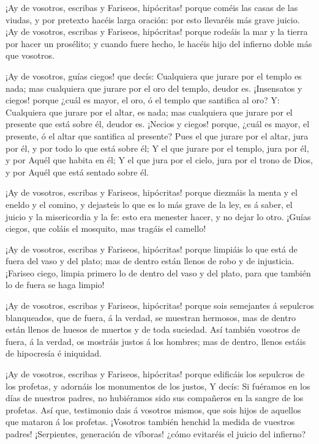  ¡Ay de vosotros, escribas y Fariseos, hipócritas! porque
coméis las casas de las viudas, y por pretexto hacéis larga oración: por
esto llevaréis más grave juicio.  ¡Ay de vosotros,
escribas y Fariseos, hipócritas! porque rodeáis la mar y la tierra por
hacer un prosélito; y cuando fuere hecho, le hacéis hijo del infierno
doble más que vosotros.

 ¡Ay de vosotros, guías ciegos! que decís: Cualquiera que
jurare por el templo es nada; mas cualquiera que jurare por el oro del
templo, deudor es.  ¡Insensatos y ciegos! porque ¿cuál es
mayor, el oro, ó el templo que santifica al oro?  Y:
Cualquiera que jurare por el altar, es nada; mas cualquiera que jurare
por el presente que está sobre él, deudor es.  ¡Necios y
ciegos! porque, ¿cuál es mayor, el presente, ó el altar que santifica al
presente?  Pues el que jurare por el altar, jura por él,
y por todo lo que está sobre él;  Y el que jurare por el
templo, jura por él, y por Aquél que habita en él;  Y el
que jura por el cielo, jura por el trono de Dios, y por Aquél que está
sentado sobre él.

 ¡Ay de vosotros, escribas y Fariseos, hipócritas! porque
diezmáis la menta y el eneldo y el comino, y dejasteis lo que es lo más
grave de la ley, es á saber, el juicio y la misericordia y la fe: esto
era menester hacer, y no dejar lo otro.  ¡Guías ciegos,
que coláis el mosquito, mas tragáis el camello!

 ¡Ay de vosotros, escribas y Fariseos, hipócritas! porque
limpiáis lo que está de fuera del vaso y del plato; mas de dentro están
llenos de robo y de injusticia.  ¡Fariseo ciego, limpia
primero lo de dentro del vaso y del plato, para que también lo de fuera
se haga limpio!

 ¡Ay de vosotros, escribas y Fariseos, hipócritas! porque
sois semejantes á sepulcros blanqueados, que de fuera, á la verdad, se
muestran hermosos, mas de dentro están llenos de huesos de muertos y de
toda suciedad.  Así también vosotros de fuera, á la
verdad, os mostráis justos á los hombres; mas de dentro, llenos estáis
de hipocresía é iniquidad.

 ¡Ay de vosotros, escribas y Fariseos, hipócritas! porque
edificáis los sepulcros de los profetas, y adornáis los monumentos de
los justos,  Y decís: Si fuéramos en los días de nuestros
padres, no hubiéramos sido sus compañeros en la sangre de los profetas.
 Así que, testimonio dais á vosotros mismos, que sois
hijos de aquellos que mataron á los profetas.  ¡Vosotros
también henchid la medida de vuestros padres! 
¡Serpientes, generación de víboras! ¿cómo evitaréis el juicio del
infierno?

